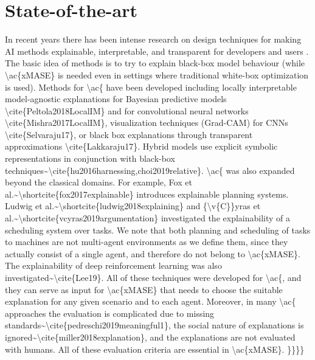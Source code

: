 \documentclass[letterpaper]{article} %
\begin{document}
{{\section{State-of-the-art}
In recent years there has been intense research on  design techniques for making AI methods explainable, interpretable, and transparent for developers and users \cite{carvalho2019machine}.
The basic idea of \ac{ methods is to try to explain black-box model behaviour (while \ac{xMASE} is needed even in settings where traditional white-box optimization is used). Methods for \ac{ have been developed including locally interpretable model-agnostic explanations for Bayesian predictive models \cite{Peltola2018LocalIM} and for convolutional neural networks \cite{Mishra2017LocalIM}, visualization techniques (Grad-CAM) for CNNs \cite{Selvaraju17}, or black box explanations through transparent approximations \cite{Lakkaraju17}. Hybrid models use explicit symbolic representations in conjunction with black-box techniques~\cite{hu2016harnessing,choi2019relative}. \ac{ was also expanded beyond the classical domains. For example, Fox et al.~\shortcite{fox2017explainable} introduces explainable planning systems. Ludwig et al.~\shortcite{ludwig2018explaining} and {\v{C}}yras et al.~\shortcite{vcyras2019argumentation} investigated the explainability of a scheduling system over tasks. We note that both planning and scheduling of tasks to machines are not multi-agent environments as we define them, since they actually consist of a single agent, and therefore do not belong to \ac{xMASE}.
The explainability of deep reinforcement learning was also investigated~\cite{Lee19}.
All of these techniques were developed for \ac{,
and they can serve as input for \ac{xMASE} that needs to choose the suitable explanation for any given scenario and to each agent. Moreover, in many \ac{ approaches the evaluation is complicated due to missing standards~\cite{pedreschi2019meaningful1}, the social nature of explanations is ignored~\cite{miller2018explanation}, and the explanations are not evaluated with humans. All of these evaluation criteria are essential in \ac{xMASE}.

}}}}}}}
\end{document}
